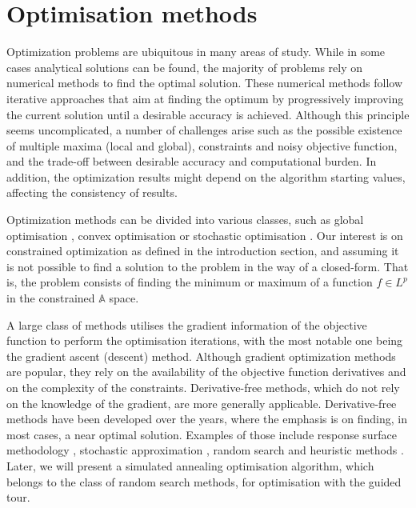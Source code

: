 \hypertarget{optim}{%
\section{Optimisation methods}\label{optim}}

Optimization problems are ubiquitous in many areas of study. While in
some cases analytical solutions can be found, the majority of problems
rely on numerical methods to find the optimal solution. These numerical
methods follow iterative approaches that aim at finding the optimum by
progressively improving the current solution until a desirable accuracy
is achieved. Although this principle seems uncomplicated, a number of
challenges arise such as the possible existence of multiple maxima
(local and global), constraints and noisy objective function, and the
trade-off between desirable accuracy and computational burden. In
addition, the optimization results might depend on the algorithm
starting values, affecting the consistency of results.

Optimization methods can be divided into various classes, such as global
optimisation \citep{kelley1999iterative, fletcher2013practical}, convex
optimisation \citep{boyd2004convex} or stochastic optimisation
\citep{nocedal2006numerical}. Our interest is on constrained
optimization \citep{bertsekas2014constrained} as defined in the
introduction section, and assuming it is not possible to find a solution
to the problem in the way of a closed-form. That is, the problem
consists of finding the minimum or maximum of a function \(f \in L^p\)
in the constrained \(\mathbb{A}\) space.

A large class of methods utilises the gradient information of the
objective function to perform the optimisation iterations, with the most
notable one being the gradient ascent (descent) method. Although
gradient optimization methods are popular, they rely on the availability
of the objective function derivatives and on the complexity of the
constraints. Derivative-free methods, which do not rely on the knowledge
of the gradient, are more generally applicable. Derivative-free methods
have been developed over the years, where the emphasis is on finding, in
most cases, a near optimal solution. Examples of those include response
surface methodology \citep{box1951experimental}, stochastic
approximation \citep{robbins1951stochastic}, random search
\citep{fu2015handbook} and heuristic methods
\citep{sorensen2013metaheuristics}. Later, we will present a simulated
annealing optimisation algorithm, which belongs to the class of random
search methods, for optimisation with the guided tour.

